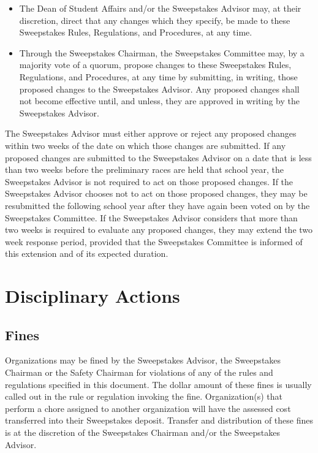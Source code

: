	\begin{itemize}

		\item
		The Dean of Student Affairs and/or the Sweepstakes Advisor may, at their discretion, direct that any changes which they specify, be made to these Sweepstakes Rules, Regulations, and Procedures, at any time.

		\item
		Through the Sweepstakes Chairman, the Sweepstakes Committee may, by a majority vote of a quorum, propose changes to these Sweepstakes Rules, Regulations, and Procedures, at any time by submitting, in writing, those proposed changes to the Sweepstakes Advisor. Any proposed changes shall not become effective until, and unless, they are approved in writing by the Sweepstakes Advisor.

	\end{itemize}

	The Sweepstakes Advisor must either approve or reject any proposed changes within two weeks of the date on which those changes are submitted. If any proposed changes are submitted to the Sweepstakes Advisor on a date that is less than two weeks before the preliminary races are held that school year, the Sweepstakes Advisor is not required to act on those proposed changes. If the Sweepstakes Advisor chooses not to act on those proposed changes, they may be resubmitted the following school year after they have again been voted on by the Sweepstakes Committee. If the Sweepstakes Advisor considers that more than two weeks is required to evaluate any proposed changes, they may extend the two week response period, provided that the Sweepstakes Committee is informed of this extension and of its expected duration.

\section{Disciplinary Actions}
\label{sec:DiciplinaryActions}

\subsection{Fines}

	Organizations may be fined by the Sweepstakes Advisor, the Sweepstakes Chairman or the Safety Chairman for violations of any of the rules and regulations specified in this document. The dollar amount of these fines is usually called out in the rule or regulation invoking the fine. Organization(s) that perform a chore assigned to another organization will have the assessed cost transferred into their Sweepstakes deposit. Transfer and distribution of these fines is at the discretion of the Sweepstakes Chairman and/or the Sweepstakes Advisor.

